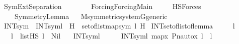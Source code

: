%
\begin{isabellebody}%
%
%
\isadelimtheory
%
\endisadelimtheory
%
\isatagtheory
{}\isamarkupfalse%
\ SymExt{\isacharunderscore}{\kern0pt}Separation\isanewline
\ \ \ \isanewline
\ \ \ \ {\isachardoublequoteopen}Forcing{\isacharslash}{\kern0pt}Forcing{\isacharunderscore}{\kern0pt}Main{\isachardoublequoteclose}\ \isanewline
\ \ \ \ HS{\isacharunderscore}{\kern0pt}Forces\isanewline
\ \ \ \ Symmetry{\isacharunderscore}{\kern0pt}Lemma\isanewline
{}%
\endisatagtheory
{\isafoldtheory}%
%
\isadelimtheory
\ \isanewline
%
\endisadelimtheory
\isanewline
{}\isamarkupfalse%
\ M{\isacharunderscore}{\kern0pt}symmetric{\isacharunderscore}{\kern0pt}system{\isacharunderscore}{\kern0pt}G{\isacharunderscore}{\kern0pt}generic\isanewline
{}\isanewline
\isanewline
\isanewline
{}\isamarkupfalse%
\ INTsym\ \ {\isachardoublequoteopen}INTsym{\isacharparenleft}{\kern0pt}l{\isacharparenright}{\kern0pt}\ {\isasymequiv}\ {\isacharparenleft}{\kern0pt}{\isasymInter}H\ {\isasymin}\ set{\isacharunderscore}{\kern0pt}of{\isacharunderscore}{\kern0pt}list{\isacharparenleft}{\kern0pt}map{\isacharparenleft}{\kern0pt}sym{\isacharcomma}{\kern0pt}\ l{\isacharparenright}{\kern0pt}{\isacharparenright}{\kern0pt}{\isachardot}{\kern0pt}\ H{\isacharparenright}{\kern0pt}{\isachardoublequoteclose}\isanewline
\isanewline
{}\isamarkupfalse%
\ INT{\isacharunderscore}{\kern0pt}set{\isacharunderscore}{\kern0pt}of{\isacharunderscore}{\kern0pt}list{\isacharunderscore}{\kern0pt}of{\isacharunderscore}{\kern0pt}{\isasymF}{\isacharunderscore}{\kern0pt}lemma\ {\isacharcolon}{\kern0pt}\ \isanewline
\ \ \ l\ \isanewline
\ \ \ {\isachardoublequoteopen}l\ {\isasymin}\ list{\isacharparenleft}{\kern0pt}HS{\isacharparenright}{\kern0pt}{\isachardoublequoteclose}\ {\isachardoublequoteopen}l\ {\isasymnoteq}\ Nil{\isachardoublequoteclose}\isanewline
\ \ \ {\isachardoublequoteopen}INTsym{\isacharparenleft}{\kern0pt}l{\isacharparenright}{\kern0pt}\ {\isasymin}\ {\isasymF}\ {\isasymand}\ {\isacharparenleft}{\kern0pt}{\isasymforall}{\isasympi}\ {\isasymin}\ INTsym{\isacharparenleft}{\kern0pt}l{\isacharparenright}{\kern0pt}{\isachardot}{\kern0pt}\ map{\isacharparenleft}{\kern0pt}{\isasymlambda}x{\isachardot}{\kern0pt}\ Pn{\isacharunderscore}{\kern0pt}auto{\isacharparenleft}{\kern0pt}{\isasympi}{\isacharparenright}{\kern0pt}{\isacharbackquote}{\kern0pt}x{\isacharcomma}{\kern0pt}\ l{\isacharparenright}{\kern0pt}\ {\isacharequal}{\kern0pt}\ l{\isacharparenright}{\kern0pt}{\isachardoublequoteclose}\isanewline

\end{isabellebody}
